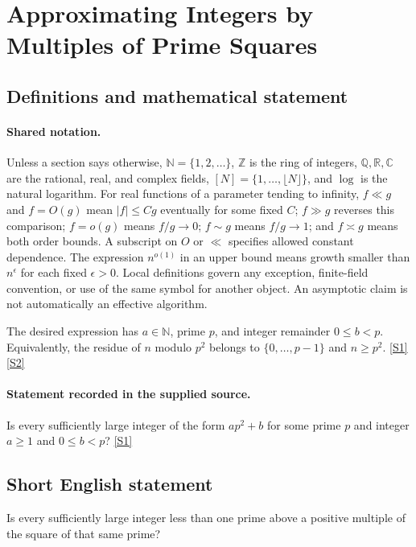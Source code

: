 \documentclass[11pt,a4paper]{article}
\newcommand{\N}{\mathbb{N}}
\newcommand{\Z}{\mathbb{Z}}
\newcommand{\Q}{\mathbb{Q}}
\newcommand{\R}{\mathbb{R}}
\newcommand{\C}{\mathbb{C}}
\newcommand{\sref}[2]{\hyperlink{source:#1:#2}{[S#2]}}
\begin{document}
\section{Approximating Integers by Multiples of Prime Squares}\label{statement}


\subsection{Definitions and mathematical statement}

\paragraph{Shared notation.}Unless a section says otherwise, $\N=\{1,2,\ldots\}$,
$\Z$ is the ring of integers, $\Q,\R,\C$ are the rational, real, and complex
fields, $[N]=\{1,\ldots,\lfloor N\rfloor\}$, and $\log$ is the natural
logarithm. For real functions of a parameter tending to infinity,
$f\ll g$ and $f=O(g)$ mean $|f|\leq Cg$ eventually for some fixed $C$;
$f\gg g$ reverses this comparison; $f=o(g)$ means $f/g\to0$;
$f\sim g$ means $f/g\to1$; and $f\asymp g$ means both order bounds.
A subscript on $O$ or $\ll$ specifies allowed constant dependence.
The expression $n^{o(1)}$ in an upper bound means growth smaller than
$n^\epsilon$ for each fixed $\epsilon>0$. Local definitions govern any
exception, finite-field convention, or use of the same symbol for another
object. An asymptotic claim is not automatically an effective algorithm.



The desired expression has $a\in\N$, prime $p$, and integer remainder $0\leq b<p$. Equivalently, the residue of $n$ modulo $p^2$ belongs to $\{0,\ldots,p-1\}$ and $n\geq p^2$. \sref{statement}{1} \sref{statement}{2}

\paragraph{Statement recorded in the supplied source.}
Is every sufficiently large integer of the form $ ap^2+b $ for some prime $p$ and integer $a\geq 1$ and $0\leq b<p$? \sref{statement}{1}

\subsection{Short English statement}

Is every sufficiently large integer less than one prime above a positive multiple of the square of that same prime?
\end{document}
